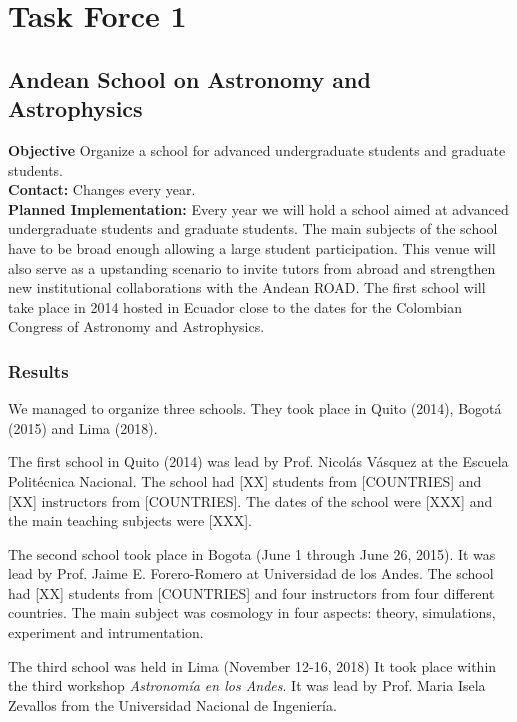 \newpage
\section{Task Force 1}
\label{chapter2}
\textit{}


\subsection{Andean School on Astronomy and Astrophysics}
\textbf{Objective} Organize a school for advanced undergraduate students and graduate students.
\\
\textbf{Contact:} Changes every year.
\\
\textbf{Planned Implementation:} 
Every year we will hold a school aimed at advanced undergraduate students and graduate students. 
The main subjects of the school have to be broad enough allowing a large student participation. 
This venue will also serve as a upstanding scenario to invite tutors from abroad and strengthen new institutional collaborations with the Andean ROAD. 
The first school will take place in 2014 hosted in Ecuador close to the dates for the Colombian Congress of Astronomy and Astrophysics.

\subsubsection{Results}

We managed to organize three schools.
They took place in Quito (2014), Bogot\'a (2015) and Lima (2018). 

The first school in Quito (2014) was lead by Prof. Nicol\'as V\'asquez at the Escuela Polit\'ecnica Nacional. 
The school had [XX] students from [COUNTRIES] and [XX] instructors from [COUNTRIES]. 
The dates of the school were [XXX] and the main teaching subjects were [XXX].

The second school took place in Bogota (June 1 through June 26, 2015). 
It was lead by Prof. Jaime E. Forero-Romero at Universidad de los Andes. 
The school had [XX] students from [COUNTRIES] and four instructors from four different countries. 
The main subject was cosmology in four aspects: theory, simulations, experiment and intrumentation.

The third school was held in Lima (November 12-16, 2018)
It took place within the third workshop \emph{Astronom\'ia en los Andes}. 
It was lead by Prof. Maria Isela Zevallos from the Universidad Nacional de Ingenier\'ia.



